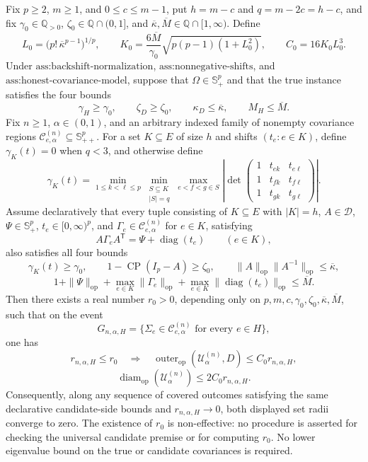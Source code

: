 Fix \(p\geq2\), \(m\geq1\), and \(0\leq c\leq m-1\), put \(h=m-c\) and \(q=m-2c=h-c\), and fix \(\gamma_0\in\mathbb Q_{>0}\), \(\zeta_0\in\mathbb Q\cap(0,1]\), and \(\overline\kappa,\overline M\in\mathbb Q\cap[1,\infty)\). Define
\[
L_0=\bigl(p!\,\overline\kappa^{p-1}\bigr)^{1/p},
\qquad
K_0=\frac{6\overline M}{\gamma_0}
\sqrt{p(p-1)(1+L_0^2)},
\qquad
C_0=16K_0L_0^3.
\]
Under \(\text{ass:backshift-normalization}\), \(\text{ass:nonnegative-shifts}\), and \(\text{ass:honest-covariance-model}\), suppose that \(\Omega\in\mathbb S_+^p\) and that the true instance satisfies the four bounds
\[
\gamma_H\geq\gamma_0,
\qquad
\zeta_D\geq\zeta_0,
\qquad
\kappa_D\leq\overline\kappa,
\qquad
M_H\leq\overline M.
\]
Fix \(n\geq1\), \(\alpha\in(0,1)\), and an arbitrary indexed family of nonempty covariance regions \(\mathcal C^{(n)}_{e,\alpha}\subseteq\mathbb S_{++}^{p}\). For a set \(K\subseteq E\) of size \(h\) and shifts \((t_e:e\in K)\), define \(\gamma_K(t)=0\) when \(q<3\), and otherwise define
\[
\gamma_K(t)=
\min_{1\leq k<\ell\leq p}
\min_{\substack{S\subseteq K\\|S|=q}}
\max_{e<f<g\in S}
\left|
\det\begin{pmatrix}
1&t_{ek}&t_{e\ell}\\
1&t_{fk}&t_{f\ell}\\
1&t_{gk}&t_{g\ell}
\end{pmatrix}
\right|.
\]
Assume declaratively that every tuple consisting of \(K\subseteq E\) with \(|K|=h\), \(A\in\mathcal D\), \(\Psi\in\mathbb S_+^p\), \(t_e\in[0,\infty)^p\), and \(\Gamma_e\in\mathcal C^{(n)}_{e,\alpha}\) for \(e\in K\), satisfying
\[
A\Gamma_eA^{\mathsf T}=\Psi+\operatorname{diag}(t_e)
\qquad(e\in K),
\]
also satisfies all four bounds
\[
\gamma_K(t)\geq\gamma_0,
\qquad
1-\operatorname{CP}(I_p-A)\geq\zeta_0,
\qquad
\|A\|_{\mathrm{op}}\|A^{-1}\|_{\mathrm{op}}
\leq\overline\kappa,
\]
\[
1+\|\Psi\|_{\mathrm{op}}
+\max_{e\in K}\|\Gamma_e\|_{\mathrm{op}}
+\max_{e\in K}\|\operatorname{diag}(t_e)\|_{\mathrm{op}}
\leq\overline M.
\]
Then there exists a real number \(r_0>0\), depending only on \(p,m,c,\gamma_0,\zeta_0,\overline\kappa,\overline M\), such that on the event
\[
G_{n,\alpha,H}
=\{\Sigma_e\in\mathcal C^{(n)}_{e,\alpha}\text{ for every }e\in H\},
\]
one has
\[
r_{n,\alpha,H}\leq r_0
\quad\Longrightarrow\quad
\operatorname{outer}_{\mathrm{op}}(\mathcal U^{(n)}_\alpha,D)
\leq C_0r_{n,\alpha,H},
\]
\[
\operatorname{diam}_{\mathrm{op}}(\mathcal U^{(n)}_\alpha)
\leq2C_0r_{n,\alpha,H}.
\]
Consequently, along any sequence of covered outcomes satisfying the same declarative candidate-side bounds and \(r_{n,\alpha,H}\to0\), both displayed set radii converge to zero. The existence of \(r_0\) is non-effective: no procedure is asserted for checking the universal candidate premise or for computing \(r_0\). No lower eigenvalue bound on the true or candidate covariances is required.